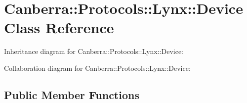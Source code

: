 \hypertarget{class_canberra_1_1_protocols_1_1_lynx_1_1_device}{}\section{Canberra\+:\+:Protocols\+:\+:Lynx\+:\+:Device Class Reference}
\label{class_canberra_1_1_protocols_1_1_lynx_1_1_device}


Inheritance diagram for Canberra\+:\+:Protocols\+:\+:Lynx\+:\+:Device\+:


Collaboration diagram for Canberra\+:\+:Protocols\+:\+:Lynx\+:\+:Device\+:
\subsection*{Public Member Functions}

